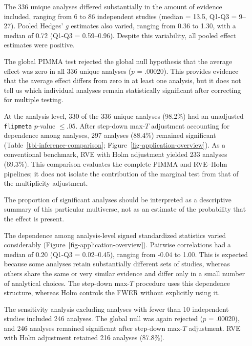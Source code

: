 \documentclass[
  man,
  longtable,
  nolmodern,
  notxfonts,
  notimes,
  colorlinks=true,linkcolor=blue,citecolor=blue,urlcolor=blue]{apa7}
\begin{document}
The 336 unique analyses differed substantially in the amount of evidence
included, ranging from 6 to 86 independent studies (median = 13.5, Q1-Q3
= 9--27). Pooled Hedges' \(g\) estimates also varied, ranging from 0.36
to 1.30, with a median of 0.72 (Q1-Q3 = 0.59--0.96). Despite this
variability, all pooled effect estimates were positive.

The global PIMMA test rejected the global null hypothesis that the
average effect was zero in all 336 unique analyses (\(p\) = .00020).
This provides evidence that the average effect differs from zero in at
least one analysis, but it does not tell us which individual analyses
remain statistically significant after correcting for multiple testing.

At the analysis level, 330 of the 336 unique analyses (98.2\%) had an
unadjusted \texttt{flipmeta} \(p\)-value \(\leq .05\). After step-down
max-\(T\) adjustment accounting for dependence among analyses, 297
analyses (88.4\%) remained significant
(Table~\ref{tbl-inference-comparison};
Figure~\ref{fig-application-overview}). As a conventional benchmark, RVE
with Holm adjustment yielded 233 analyses (69.3\%). This comparison
evaluates the complete PIMMA and RVE--Holm pipelines; it does not
isolate the contribution of the marginal test from that of the
multiplicity adjustment.

The proportion of significant analyses should be interpreted as a
descriptive summary of this particular multiverse, not as an estimate of
the probability that the effect is present.

The dependence among analysis-level signed standardized statistics
varied considerably (Figure~\ref{fig-application-overview}). Pairwise
correlations had a median of 0.20 (Q1-Q3 = 0.02--0.45), ranging from
-0.04 to 1.00. This is expected because some analyses retain
substantially different sets of studies, whereas others share the same
or very similar evidence and differ only in a small number of analytical
choices. The step-down max-\(T\) procedure uses this dependence
structure, whereas Holm controls the FWER without explicitly using it.

The sensitivity analysis excluding analyses with fewer than 10
independent studies included 246 analyses. The global null was again
rejected (\(p\) = .00020), and 246 analyses remained significant after
step-down max-\(T\) adjustment. RVE with Holm adjustment retained 216
analyses (87.8\%).
\end{document}
